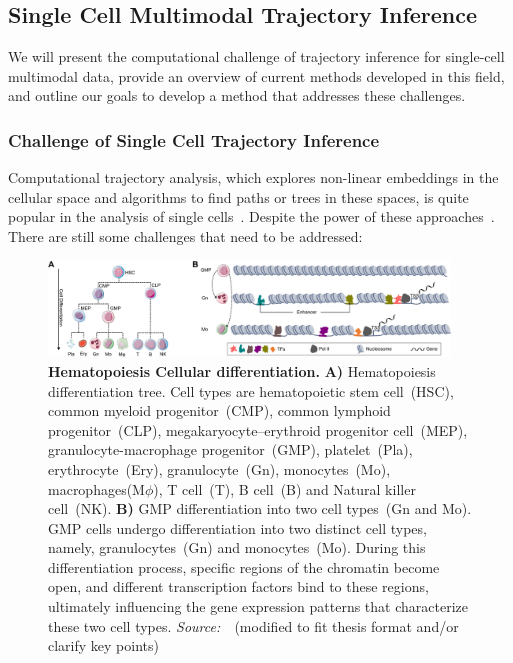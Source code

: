 \subsection{Single Cell Multimodal Trajectory Inference}
We will present the computational challenge of trajectory inference for single-cell multimodal data, provide an overview of current methods developed in this field, and outline our goals to develop a method that addresses these challenges.

\subsubsection{Challenge of Single Cell Trajectory Inference}
\label{background:sec2:challenge_TI}
Computational trajectory analysis, which explores non-linear embeddings in the cellular space and algorithms to find paths or trees in these spaces, is quite popular in the analysis of single cells~\citep{wolf2019paga,chen2019stream,street2018slingshot,Lynch2022}. Despite the power of these approaches~\citep{saelens2019comparison}. There are still some challenges that need to be addressed:

\begin{figure}[!h]
	\centering
	\includegraphics[width=0.95\textwidth]{cell_differentiation/fig}
	\vspace{0.1cm}
	\caption[Hematopoiesis Cellular Differentiation]{\textbf{Hematopoiesis Cellular differentiation.} \textbf{A)} Hematopoiesis differentiation tree. Cell types are hematopoietic stem cell~(HSC), common myeloid progenitor~(CMP),  common lymphoid progenitor~(CLP), megakaryocyte–erythroid progenitor cell~(MEP), granulocyte-macrophage progenitor~(GMP), platelet~(Pla), erythrocyte~(Ery), granulocyte~(Gn), monocytes~(Mo), macrophages(M$\phi$), T cell~(T), B cell~(B) and Natural killer cell~(NK). \textbf{B)} GMP differentiation into two cell types~(Gn and Mo). GMP cells undergo differentiation into two distinct cell types, namely, granulocytes~(Gn) and monocytes~(Mo). During this differentiation process, specific regions of the chromatin become open, and different transcription factors bind to these regions, ultimately influencing the gene expression patterns that characterize these two cell types. \emph{Source:~\cite{costa2023dissecting}}~(modified to fit thesis format and/or clarify key points)}
	\label{fig:cell_differentiation}
\end{figure}


